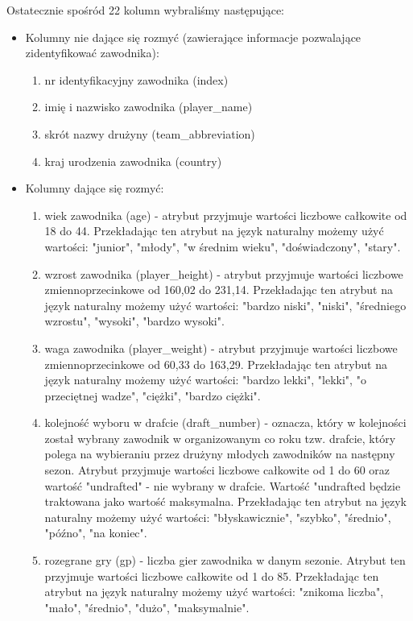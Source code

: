\documentclass{classrep}
\begin{document}
Ostatecznie spośród 22 kolumn wybraliśmy następujące:
\begin{itemize}
    \item Kolumny nie dające się rozmyć (zawierające informacje pozwalające zidentyfikować zawodnika):
    \begin{enumerate}
        \item nr identyfikacyjny zawodnika (index)
        \item imię i nazwisko zawodnika (player\_name)
        \item skrót nazwy drużyny (team\_abbreviation)
        \item kraj urodzenia zawodnika (country)
    \end{enumerate}
    \item Kolumny dające się rozmyć:
    \begin{enumerate}
        \item wiek zawodnika (age) - atrybut przyjmuje wartości liczbowe całkowite od 18 do 44. Przekładając ten atrybut na język naturalny możemy użyć wartości: "junior", "młody", "w średnim wieku", "doświadczony", "stary". 
        \item wzrost zawodnika (player\_height) - atrybut przyjmuje wartości liczbowe zmiennoprzecinkowe od 160,02 do 231,14. Przekładając ten atrybut na język naturalny możemy użyć wartości: "bardzo niski", "niski", "średniego wzrostu", "wysoki", "bardzo wysoki".
        \item waga zawodnika (player\_weight) - atrybut przyjmuje wartości liczbowe zmiennoprzecinkowe od 60,33 do 163,29. Przekładając ten atrybut na język naturalny możemy użyć wartości: "bardzo lekki", "lekki", "o przeciętnej wadze", "ciężki", "bardzo ciężki".
        \item kolejność wyboru w drafcie (draft\_number) - oznacza, który w kolejności został wybrany zawodnik w organizowanym co roku tzw. drafcie, który polega na wybieraniu przez drużyny młodych zawodników na następny sezon. Atrybut przyjmuje wartości liczbowe całkowite od 1 do 60 oraz wartość "undrafted" - nie wybrany w drafcie. Wartość "undrafted będzie traktowana jako wartość maksymalna. Przekładając ten atrybut na język naturalny możemy użyć wartości: "błyskawicznie", "szybko", "średnio", "późno", "na koniec".
        \item rozegrane gry (gp) - liczba gier zawodnika w danym sezonie. Atrybut ten przyjmuje wartości liczbowe całkowite od 1 do 85.  Przekładając ten atrybut na język naturalny możemy użyć wartości: "znikoma liczba", "mało", "średnio", "dużo", "maksymalnie".

\end{enumerate}
\end{itemize}
\end{document}
